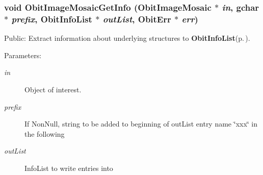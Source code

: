 \subsubsection{\setlength{\rightskip}{0pt plus 5cm}void Obit\-Image\-Mosaic\-Get\-Info ({\bf Obit\-Image\-Mosaic} $\ast$ {\em in}, gchar $\ast$ {\em prefix}, {\bf Obit\-Info\-List} $\ast$ {\em out\-List}, {\bf Obit\-Err} $\ast$ {\em err})}\label{ObitImageMosaic_8h_a27}


Public: Extract information about underlying structures to {\bf Obit\-Info\-List}{\rm (p.\,\pageref{structObitInfoList})}. 

\begin{Desc}
\item[Parameters:]
\begin{description}
\item[{\em in}]Object of interest. \item[{\em prefix}]If Non\-Null, string to be added to beginning of out\-List entry name \char`\"{}xxx\char`\"{} in the following \item[{\em out\-List}]Info\-List to write entries into \begin{itemize}

\end{itemize}
\end{description}
\end{Desc}
